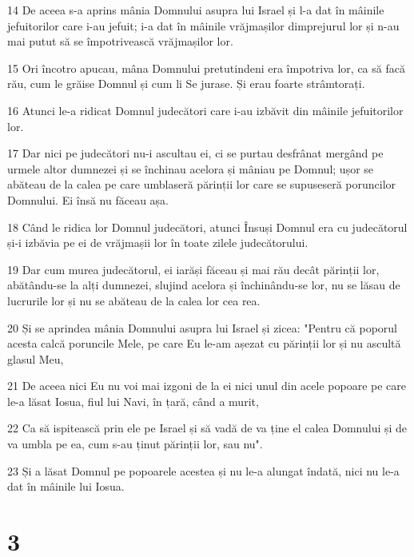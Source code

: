\par 14 De aceea s-a aprins mânia Domnului asupra lui Israel și l-a dat în mâinile jefuitorilor care i-au jefuit; i-a dat în mâinile vrăjmașilor dimprejurul lor și n-au mai putut să se împotrivească vrăjmașilor lor.
\par 15 Ori încotro apucau, mâna Domnului pretutindeni era împotriva lor, ca să facă rău, cum le grăise Domnul și cum li Se jurase. Și erau foarte strâmtorați.
\par 16 Atunci le-a ridicat Domnul judecători care i-au izbăvit din mâinile jefuitorilor lor.
\par 17 Dar nici pe judecători nu-i ascultau ei, ci se purtau desfrânat mergând pe urmele altor dumnezei și se închinau acelora și mâniau pe Domnul; ușor se abăteau de la calea pe care umblaseră părinții lor care se supuseseră poruncilor Domnului. Ei însă nu făceau așa.
\par 18 Când le ridica lor Domnul judecători, atunci Însuși Domnul era cu judecătorul și-i izbăvia pe ei de vrăjmașii lor în toate zilele judecătorului.
\par 19 Dar cum murea judecătorul, ei iarăși făceau și mai rău decât părinții lor, abătându-se la alți dumnezei, slujind acelora și închinându-se lor, nu se lăsau de lucrurile lor și nu se abăteau de la calea lor cea rea.
\par 20 Și se aprindea mânia Domnului asupra lui Israel și zicea: "Pentru că poporul acesta calcă poruncile Mele, pe care Eu le-am așezat cu părinții lor și nu ascultă glasul Meu,
\par 21 De aceea nici Eu nu voi mai izgoni de la ei nici unul din acele popoare pe care le-a lăsat Iosua, fiul lui Navi, în țară, când a murit,
\par 22 Ca să ispitească prin ele pe Israel și să vadă de va ține el calea Domnului și de va umbla pe ea, cum s-au ținut părinții lor, sau nu".
\par 23 Și a lăsat Domnul pe popoarele acestea și nu le-a alungat îndată, nici nu le-a dat în mâinile lui Iosua.

\chapter{3}

